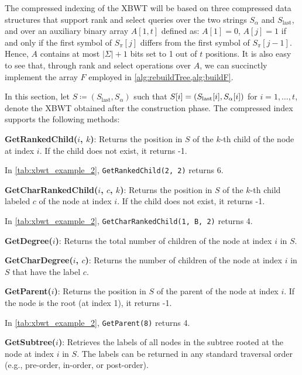 The compressed indexing of the XBWT will be based on three compressed data structures that support rank and select queries over the two strings $S_{\alpha}$ and $S_{\text{last}}$, and over an auxiliary binary array $A[1, t]$ defined as: $A[1] = 0$, $A[j] = 1$ if and only if the first symbol of $S_{\pi}[j]$ differs from the first symbol of $S_{\pi}[j - 1]$. 
Hence, $A$ contains at most $|\Sigma| + 1$ bits set to 1 out of $t$ positions. It is also easy to see that, through rank and select operations over $A$, we can succinctly implement the array $F$ employed in \cref{alg:rebuildTree,alg:buildF}.

In this section, let $S \coloneq (S_{\text{last}}, S_{\alpha})$ such that $S[i] = (S_{\textup{last}}[i], S_\alpha[i])$ for $i = 1,\dots,t$, denote the XBWT obtained after the construction phase.
The compressed index supports the following methods:

\textbf{GetRankedChild($i$, $k$)}: Returns the position in $S$ of the $k$-th child of the node at index $i$. If the child does not exist, it returns -1. 
\begin{example}
    In \cref{tab:xbwt_example_2}, \texttt{GetRankedChild(2, 2)} returns 6.
\end{example}

\textbf{GetCharRankedChild($i$, $c$, $k$)}: Returns the position in $S$ of the $k$-th child labeled $c$ of the node at index $i$. If the child does not exist, it returns -1.
\begin{example}
    In \cref{tab:xbwt_example_2}, \texttt{GetCharRankedChild(1, B, 2)} returns 4.
\end{example}

\textbf{GetDegree($i$)}: Returns the total number of children of the node at index $i$ in $S$.

\textbf{GetCharDegree($i$, $c$)}: Returns the number of children of the node at index $i$ in $S$ that have the label $c$.

\textbf{GetParent($i$)}: Returns the position in $S$ of the parent of the node at index $i$. If the node is the root (at index 1), it returns -1.
\begin{example}
    In \cref{tab:xbwt_example_2}, \texttt{GetParent(8)} returns 4.
\end{example}

\textbf{GetSubtree($i$)}: Retrieves the labels of all nodes in the subtree rooted at the node at index $i$ in $S$. The labels can be returned in any standard traversal order (e.g., pre-order, in-order, or post-order).

